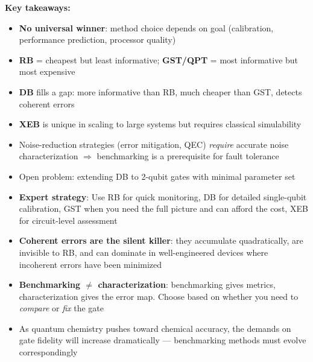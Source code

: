 \documentclass[10pt,a4paper]{article}
\begin{document}
\textbf{Key takeaways:}
\begin{itemize}
  \item \textbf{No universal winner}: method choice depends on goal (calibration, performance prediction, processor quality)
  \item \textbf{RB} = cheapest but least informative; \textbf{GST/QPT} = most informative but most expensive
  \item \textbf{DB} fills a gap: more informative than RB, much cheaper than GST, detects coherent errors
  \item \textbf{XEB} is unique in scaling to large systems but requires classical simulability
  \item Noise-reduction strategies (error mitigation, QEC) \emph{require} accurate noise characterization $\Rightarrow$ benchmarking is a prerequisite for fault tolerance
  \item Open problem: extending DB to 2-qubit gates with minimal parameter set
\end{itemize}

\begin{insightbox}
\begin{itemize}
  \item \textbf{Expert strategy}: Use RB for quick monitoring, DB for detailed single-qubit calibration, GST when you need the full picture and can afford the cost, XEB for circuit-level assessment
  \item \textbf{Coherent errors are the silent killer}: they accumulate quadratically, are invisible to RB, and can dominate in well-engineered devices where incoherent errors have been minimized
  \item \textbf{Benchmarking $\neq$ characterization}: benchmarking gives metrics, characterization gives the error map. Choose based on whether you need to \emph{compare} or \emph{fix} the gate
  \item As quantum chemistry pushes toward chemical accuracy, the demands on gate fidelity will increase dramatically --- benchmarking methods must evolve correspondingly
\end{itemize}
\end{insightbox}
\end{document}
